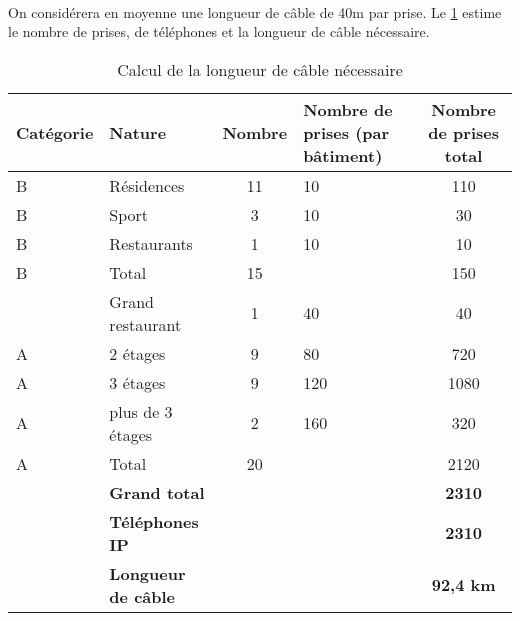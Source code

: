 \paragraph{} On considérera en moyenne une longueur de câble de 40m par prise.
Le \ref{table_cable} estime le nombre de prises, de téléphones et la longueur de
câble nécessaire.

\begin{table}[p]
  \caption{\label{table_cable} Calcul de la longueur de câble nécessaire}
  \begin{tabular}{|l|l|c|m{4cm}|c|}
    \hline
    Catégorie & Nature & Nombre & Nombre de prises (par bâtiment) & Nombre
    de prises total \\
    \hline
    B & Résidences & 11 & 10 & 110 \\
    B & Sport & 3 & 10 & 30 \\
    B & Restaurants & 1 & 10 & 10 \\
    \hline
    B & Total & 15 & & 150 \\
    \hline
      & Grand restaurant & 1 & 40 & 40 \\
    \hline
    A & 2 étages         & 9 & 80  & 720 \\
    A & 3 étages         & 9 & 120 & 1080 \\
    A & plus de 3 étages & 2 & 160 & 320 \\
    \hline
    A & Total            & 20 & & 2120 \\
    \hline
    \hline
      & \bf{Grand total} & & & \bf{2310} \\
      & \bf{Téléphones IP} & & & \bf{2310} \\
      & \bf{Longueur de câble} & & & \bf{92,4 km} \\
    \hline
  \end{tabular}
\end{table}


